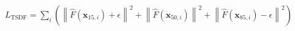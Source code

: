$L_{\mathrm{TSDF}}=\sum_i\left(\left\| \hat{F}\left( \mathbf{x}_{15,i} \right) +\epsilon \right\|^2+\left\| \hat{F}\left( \mathbf{x}_{50,i} \right) \right\|^2+\left\| \hat{F}\left( \mathbf{x}_{85,i} \right) -\epsilon \right\|^2\right)$